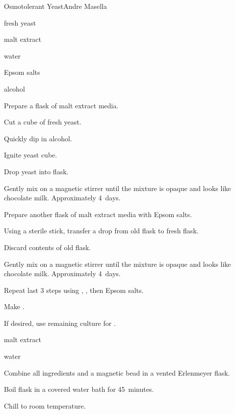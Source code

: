 \begin{recipe}{Osmotolerant Yeast}{Andre Masella}{}

\begin{ingredients}
\item fresh yeast
\item malt extract
\item water
\item Epsom salts
\item alcohol
\end{ingredients}

\begin{directions}
\item Prepare a flask of malt extract media.
\item Cut a cube of fresh yeast.
\item Quickly dip in alcohol.
\item Ignite yeast cube.
\item Drop yeast into flask.
\item Gently mix on a magnetic stirrer until the mixture is opaque and looks like chocolate milk. Approximately 4~days.
\item Prepare another flask of malt extract media with  Epsom salts.
\item Using a sterile stick, transfer a drop from old flask to fresh flask.
\item Discard contents of old flask.
\item Gently mix on a magnetic stirrer until the mixture is opaque and looks like chocolate milk. Approximately 4~days.
\item Repeat last 3 steps using , , then  Epsom salts.
\item Make .
\item If desired, use remaining culture for .
\end{directions}

\begin{ingredients}
\item {} malt extract
\item {} water
\end{ingredients}

\begin{directions}
\item Combine all ingredients and a magnetic bead in a vented  Erlenmeyer flask.
\item Boil flask in a covered water bath for 45~minutes.
\item Chill to room temperature.
\end{directions}
\end{recipe}
